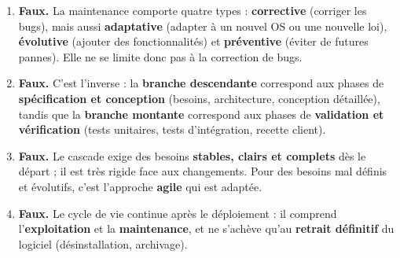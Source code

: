 \documentclass[11pt]{article}
\begin{document}
\begin{corrige}
\begin{enumerate}
    \item \textbf{Faux.} La maintenance comporte quatre types : \textbf{corrective} (corriger les bugs), mais aussi \textbf{adaptative} (adapter à un nouvel OS ou une nouvelle loi), \textbf{évolutive} (ajouter des fonctionnalités) et \textbf{préventive} (éviter de futures pannes). Elle ne se limite donc pas à la correction de bugs.
    \item \textbf{Faux.} C'est l'inverse : la \textbf{branche descendante} correspond aux phases de \textbf{spécification et conception} (besoins, architecture, conception détaillée), tandis que la \textbf{branche montante} correspond aux phases de \textbf{validation et vérification} (tests unitaires, tests d'intégration, recette client).
    \item \textbf{Faux.} Le cascade exige des besoins \textbf{stables, clairs et complets} dès le départ ; il est très rigide face aux changements. Pour des besoins mal définis et évolutifs, c'est l'approche \textbf{agile} qui est adaptée.
    \item \textbf{Faux.} Le cycle de vie continue après le déploiement : il comprend l'\textbf{exploitation} et la \textbf{maintenance}, et ne s'achève qu'au \textbf{retrait définitif} du logiciel (désinstallation, archivage).
\end{enumerate}
\end{corrige}
\end{document}
